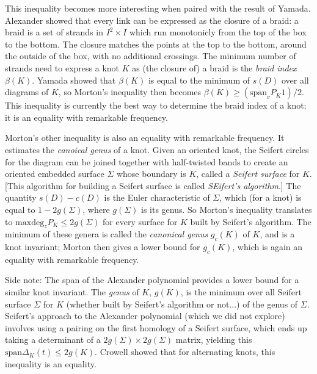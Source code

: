 \ssk

This inequality becomes more interesting when paired with the result of Yamada.
Alexander showed that every link can be expressed as the closure of a braid:
a braid is a set of strands in $I^2\times I$ which run monotonicly from the
top of the box to the bottom. The closure matches the points at the top to the 
bottom, around the outside of the box, with no additional crossings.
The minimum number of strands need to express a knot $K$ as (the closure of)
a braid is the {\it braid index} $\beta(K)$. Yamada showed that $\beta(K)$ 
is equal to the minimum of $s(D)$ over all diagrams of $K$, so Morton's
inequality then becomes $\beta(K)\geq (\text{span}_v P_K 1)/2$. This inequality
is currently the best way to determine the braid index of a knot; it is
an equality with remarkable frequency.

\ssk

Morton's other inequality is also an equality with remarkable frequency. It 
estimates the {\it canoical genus} of a knot. Given an oriented knot, the
Seifert circles for the diagram can be joined together with half-twisted
bands to create an oriented embedded surface $\Sigma$ whose boundary is $K$, called
a {\it Seifert surface} for $K$. [This algorithm for building a Seifert
surface is called {\it SEifert's algorithm}.] 
The quantity $s(D)-c(D)$ is the Euler characteristic
of $\Sigma$, which (for a knot) is equal to $1-2g(\Sigma)$, where $g(\Sigma)$ is its
genus. So Morton's inequality translates to $\text{maxdeg}_z P_K\leq 2g(\Sigma)$
for every surface for $K$ built by Seifert's algorithm. The minimum of these
genera is called the {\it canonical genus} $g_c(K)$ of $K$, and is a knot invariant;
Morton then gives a lower bound for $g_c(K)$, which is again an equality with
remarkable frequency.

\ssk

Side note: The span of the Alexander polynomial provides a lower bound for a 
similar knot invariant. The {\it genus} of $K$, $g(K)$, is the minimum over all 
Seifert surface $\Sigma$ for $K$ (whether built by Seifert's
algorithm or not...) of the genus of $\Sigma$. Seifert's approach to the
Alexander polynomial (which we did not explore) involves using a pairing
on the first homology of a Seifert surface, which ends up taking a determinant
of a $2g(\Sigma)\times 2g(\Sigma)$ matrix, yielding this 
$\text{span}\Delta_K(t)\leq 2g(K)$. Crowell showed that for alternating knots,
this inequality is an equality.

\ssk

